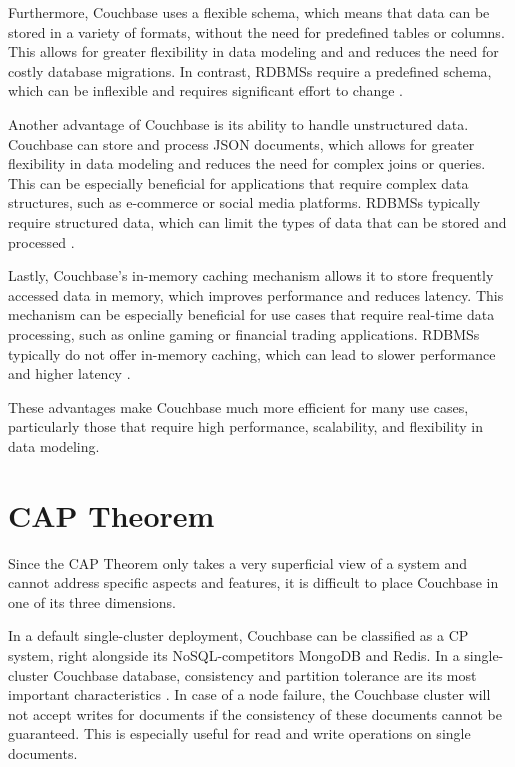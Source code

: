 Furthermore, Couchbase uses a flexible schema, which means that data can be stored in a variety of formats, without the need for predefined tables or columns. This allows for greater flexibility in data modeling and
and reduces the need for costly database migrations. In contrast, \acp{RDBMS} require a predefined
schema, which can be inflexible and requires significant effort to change \parencite{CouchbaseVsRelational, ComparingDatabases, DifferencesBetweenDatabases}.

Another advantage of Couchbase is its ability to handle unstructured data. Couchbase can store and process \ac{JSON} documents, which allows for greater flexibility in data modeling and reduces the need for complex joins or queries. This can be especially beneficial for applications that require complex data structures, such as e-commerce or social media platforms. \acp{RDBMS} typically require structured data, which can limit the types of data that can be stored and processed \parencite{CouchbaseVsRelational, ComparingDatabases, DifferencesBetweenDatabases}.

Lastly, Couchbase's in-memory caching mechanism allows it to store frequently accessed data in memory, which improves performance and reduces latency. This mechanism can be especially beneficial for use cases that require real-time data processing, such as online gaming or financial trading applications. \acp{RDBMS} typically do not offer in-memory caching, which can lead to slower performance and higher latency \parencite{CouchbaseVsRelational, ComparingDatabases, DifferencesBetweenDatabases}.

These advantages make Couchbase much more efficient for many use cases, particularly those that require high performance, scalability, and flexibility in data modeling.

\section{CAP Theorem}

Since the \ac{CAP} Theorem only takes a very superficial view of a system and cannot address specific aspects and features, it is difficult to place Couchbase in one of its three dimensions.

In a default single-cluster deployment, Couchbase can be classified as a \ac{CP} system, right alongside its \ac{NoSQL}-competitors MongoDB and Redis. In a single-cluster Couchbase database, consistency and partition tolerance are its most important characteristics \parencite{Ostrovsky.2015}. In case of a node failure, the Couchbase cluster will not accept writes for documents if the consistency of these documents cannot be guaranteed. This is especially useful for read and write operations on single documents.

